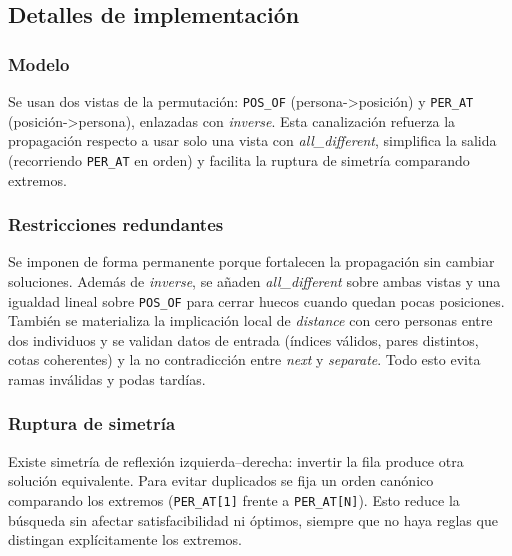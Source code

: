 
\subsection{Detalles de implementación}\label{sec:05-reunion-impl}

\subsubsection*{Modelo}
Se usan dos vistas de la permutación: \texttt{POS\_OF} (persona->posición) y \texttt{PER\_AT} (posición->persona), enlazadas con \textit{inverse}. Esta canalización refuerza la propagación respecto a usar solo una vista con \textit{all\_different}, simplifica la salida (recorriendo \texttt{PER\_AT} en orden) y facilita la ruptura de simetría comparando extremos.

\subsubsection*{Restricciones redundantes}
Se imponen de forma permanente porque fortalecen la propagación sin cambiar soluciones. Además de \textit{inverse}, se añaden \textit{all\_different} sobre ambas vistas y una igualdad lineal sobre \texttt{POS\_OF} para cerrar huecos cuando quedan pocas posiciones. También se materializa la implicación local de \textit{distance} con cero personas entre dos individuos y se validan datos de entrada (índices válidos, pares distintos, cotas coherentes) y la no contradicción entre \textit{next} y \textit{separate}. Todo esto evita ramas inválidas y podas tardías.

\subsubsection*{Ruptura de simetría}
Existe simetría de reflexión izquierda–derecha: invertir la fila produce otra solución equivalente. Para evitar duplicados se fija un orden canónico comparando los extremos (\texttt{PER\_AT[1]} frente a \texttt{PER\_AT[N]}). Esto reduce la búsqueda sin afectar satisfacibilidad ni óptimos, siempre que no haya reglas que distingan explícitamente los extremos.
